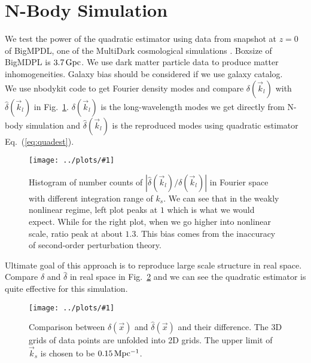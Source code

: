 \documentclass[prd,amsmath,amssymb,floatfix,superscriptaddress,nofootinbib,twocolumn]{revtex4-1}
\newcommand{\vk}{\vec{k}}
\newcommand{\ec}[1]{Eq.~(\ref{eq:#1})}
\newcommand{\rf}[1]{\ref{fig:#1}}
\newcommand{\sfig}[2]{
\texttt{[image: ../plots/\#1]}
        }
\newcommand{\sfigg}[2]{
\texttt{[image: ../plots/\#1]}
        }
\newcommand{\Sfig}[2]{
   \begin{figure}[thbp]
   \begin{center}
    \sfig{../plots/#1.pdf}{\columnwidth}
    \caption{{\small #2}}
    \label{fig:#1}
     \end{center}
   \end{figure}
}
\newcommand{\Sfigg}[2]{
   \begin{figure}[thbp]
    \sfigg{../plots/#1.pdf}{\columnwidth}
    \caption{{\small #2}}
    \label{fig:#1}
   \end{figure}
}
\begin{document}
\section{N-Body Simulation}\label{sec3}
We test the power of the quadratic estimator using data from snapshot at $z=0$ of BigMPDL, one of the MultiDark cosmological simulations \cite{Klypin:2014nov}. Boxsize of BigMDPL is $3.7\,\rm Gpc$. We use dark matter particle data to produce matter inhomogeneities. Galaxy bias should be considered if we use galaxy catalog.\\
We use nbodykit code to get Fourier density modes \cite{Hand:2018nby} and compare $\delta(\vk_l)$ with $\hat{\delta}(\vk_l)$ in Fig.~\rf{hist}. $\delta(\vk_l)$ is the long-wavelength modes we get directly from N-body simulation and $\hat{\delta}(\vk_l)$ is the reproduced modes using quadratic estimator \ec{quadest}.\\
\Sfig{hist}{Histogram of number counts of $|\hat{\delta}(\vk_l)/\delta(\vk_l)|$ in Fourier space with different integration range of $k_s$. We can see that in the weakly nonlinear regime, left plot peaks at $1$ which is what we would expect. While for the right plot, when we go higher into nonlinear scale, ratio peak at about $1.3$. This bias comes from the inaccuracy of second-order perturbation theory.}

Ultimate goal of this approach is to reproduce large scale structure in real space. Compare $\delta$ and $\hat{\delta}$ in real space in Fig.~\rf{real} and we can see the quadratic estimator is quite effective for this simulation.
\Sfigg{real}{Comparison between $\delta(\vec{x})$ and $\hat{\delta}(\vec{x})$ and their difference. The 3D grids of data points are unfolded into 2D grids. The upper limit of $\vk_s$ is chosen to be $0.15 \, \rm Mpc^{-1}$.}
\end{document}
